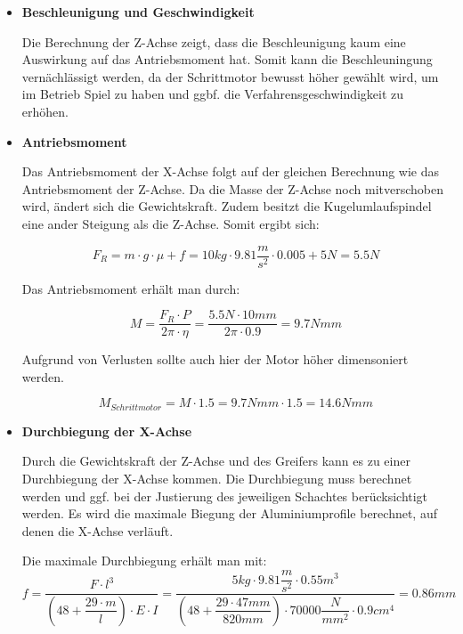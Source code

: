 \begin{itemize}

\item \textbf{Beschleunigung und Geschwindigkeit}

Die Berechnung der Z-Achse zeigt, dass die Beschleunigung kaum eine Auswirkung auf das Antriebsmoment hat. Somit kann die Beschleuningung vernächlässigt werden, da der Schrittmotor bewusst höher gewählt wird, um im Betrieb Spiel zu haben und ggbf. die Verfahrensgeschwindigkeit zu erhöhen.


\item \textbf{Antriebsmoment}

Das Antriebsmoment der X-Achse folgt auf der gleichen Berechnung wie das Antriebsmoment der Z-Achse. Da die Masse der Z-Achse noch mitverschoben wird, ändert sich die Gewichtskraft. Zudem besitzt die Kugelumlaufspindel eine ander Steigung als die Z-Achse. Somit ergibt sich:

\[F_R=m \cdot g\cdot \mu + f=10kg\cdot 9.81\dfrac{m}{s^2}  \cdot 0.005 + 5N=5.5N\]


Das Antriebsmoment erhält man durch: 

\[M=\dfrac{F_R\cdot P}{2\pi \cdot \eta}=\dfrac{5.5N\cdot 10mm}{2\pi \cdot 0.9}=9.7Nmm\]

Aufgrund von Verlusten sollte auch hier der Motor höher dimensoniert werden.

\[M_{Schrittmotor}=M \cdot 1.5 = 9.7Nmm \cdot 1.5 = 14.6Nmm\]


\item \textbf{Durchbiegung der X-Achse}

Durch die Gewichtskraft der Z-Achse und des Greifers kann es zu einer Durchbiegung der X-Achse kommen. Die Durchbiegung muss berechnet werden und ggf. bei der Justierung des jeweiligen Schachtes berücksichtigt werden. Es wird die maximale Biegung der Aluminiumprofile berechnet, auf denen die X-Achse verläuft.\\
\newline



Die maximale Durchbiegung erhält man mit:\\

\[f=\dfrac{F\cdot l^3}{(48+\dfrac{29\cdot m}{l})\cdot E \cdot I} = \dfrac{5kg\cdot 9.81\dfrac{m}{s^2}\cdot 0.55m^3}{(48+\dfrac{29\cdot 47mm}{820mm})\cdot 70000\dfrac{N}{mm^2}\cdot 0.9cm^4} = 0.86mm\]


\end{itemize}
